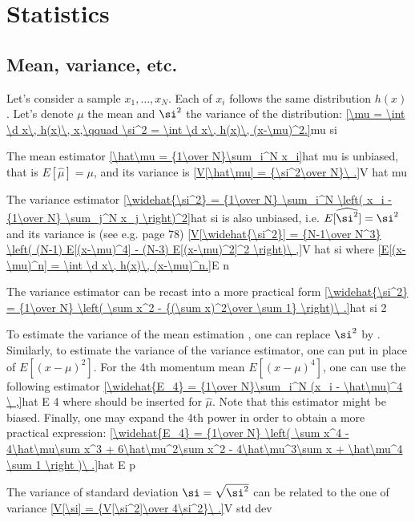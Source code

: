 
\appendices

\chapter{Statistics}

\section{Mean, variance, etc.}

Let's consider a sample ${x_1, \ldots, x_N}$. Each of $x_i$ follows the same distribution $h(x)$. Let's denote $\mu$ the mean and $\si^2$ the variance of the distribution:
\eqref{\mu = \int \d x\, h(x)\, x,\qquad \si^2 = \int \d x\, h(x)\, (x-\mu)^2.}{mu si}

The mean estimator
\eqref{\hat\mu = {1\over N}\sum_i^N x_i}{hat mu}
is unbiased, that is $E[\hat\mu] = \mu$, and its variance is
\eqref{V[\hat\mu] = {\si^2\over N}\ .}{V hat mu}

The variance estimator
\eqref{\widehat{\si^2} = {1\over N} \sum_i^N \left( x_i - {1\over N} \sum_j^N x_j \right)^2}{hat si}
is also unbiased, i.e. $E[\widehat{\si^2}] = \si^2$ and its variance is (see e.g.  page 78)
\eqref{V[\widehat{\si^2}] = {N-1\over N^3} \left( (N-1) E[(x-\mu)^4] - (N-3) E[(x-\mu)^2]^2 \right)\ ,}{V hat si}
where
\eqref{E[(x-\mu)^n] = \int \d x\, h(x)\, (x-\mu)^n.}{E n}

The variance estimator can be recast into a more practical form
\eqref{\widehat{\si^2} = {1\over N} \left( \sum x^2 - {(\sum x)^2\over \sum 1} \right)\ .}{hat si 2}

To estimate the variance of the mean estimation , one can replace $\si^2$ by . Similarly, to estimate the variance of the variance estimator, one can put  in place of $E[(x-\mu)^2]$. For the 4th momentum mean $E[(x-\mu)^4]$, one can use the following estimator
\eqref{\widehat{E_4} = {1\over N}\sum_i^N (x_i - \hat\mu)^4 \ ,}{hat E 4}
where  should be inserted for $\hat\mu$. Note that this estimator might be biased. Finally, one may expand the 4th power in order to obtain a more practical expression:
\eqref{\widehat{E_4} = {1\over N} \left( \sum x^4 - 4\hat\mu\sum x^3 + 6\hat\mu^2\sum x^2 - 4\hat\mu^3\sum x + \hat\mu^4 \sum 1 \right )\ .}{hat E p}

The variance of standard deviation $\si = \sqrt{\si^2}$ can be related to the one of variance
\eqref{V[\si] = {V[\si^2]\over 4\si^2}\ .}{V std dev}

